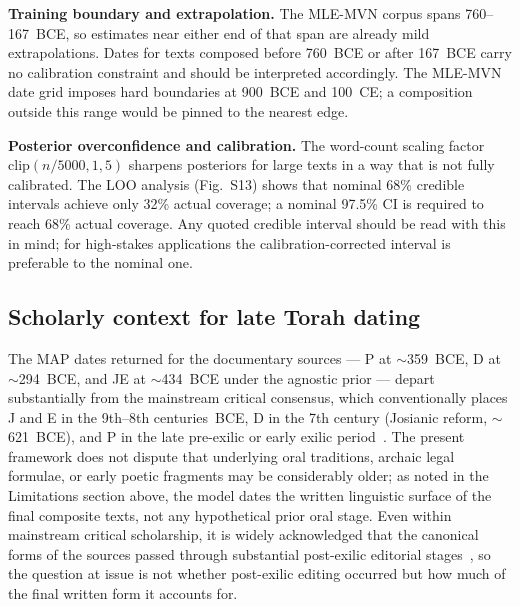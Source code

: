 \documentclass[10pt,letterpaper]{article}
\newcommand{\mvn}{MLE-MVN}
\begin{document}
\textbf{Training boundary and extrapolation.}  The \mvn{} corpus spans
760--167~BCE, so estimates near either end of that span are already mild
extrapolations.  Dates for texts composed before 760~BCE or
after 167~BCE carry no calibration constraint and should be interpreted
accordingly.  The \mvn{} date grid imposes hard boundaries at 900~BCE
and 100~CE; a composition outside this range would be pinned to the
nearest edge.

\textbf{Posterior overconfidence and calibration.}  The word-count
scaling factor $\mathrm{clip}(n/5000,1,5)$ sharpens posteriors for large
texts in a way that is not fully calibrated.  The LOO analysis
(Fig.~S13) shows that nominal 68\% credible intervals achieve only 32\%
actual coverage; a nominal 97.5\% CI is required to reach 68\% actual
coverage.  Any quoted credible interval should be read with this in mind;
for high-stakes applications the calibration-corrected interval is
preferable to the nominal one.

\subsection*{Scholarly context for late Torah dating}

The MAP dates returned for the documentary sources ---
P at $\sim$359~BCE, D at $\sim$294~BCE, and JE at $\sim$434~BCE under the
agnostic prior --- depart substantially from the mainstream critical
consensus, which conventionally places J and E in the 9th--8th
centuries~BCE, D in the 7th century (Josianic reform, $\sim$621~BCE), and
P in the late pre-exilic or early exilic
period~\cite{Wellhausen1885,Baden2012}.  The present framework does not
dispute that underlying oral traditions, archaic legal formulae, or early
poetic fragments may be considerably older; as noted in the Limitations
section above, the model dates the written linguistic surface of the final
composite texts, not any hypothetical prior oral stage.  Even within
mainstream critical scholarship, it is widely acknowledged that the
canonical forms of the sources passed through substantial post-exilic
editorial stages~\cite{CarrFormation2011,Romer2005}, so the question at
issue is not whether post-exilic editing occurred but how much of the
final written form it accounts for.
\end{document}
